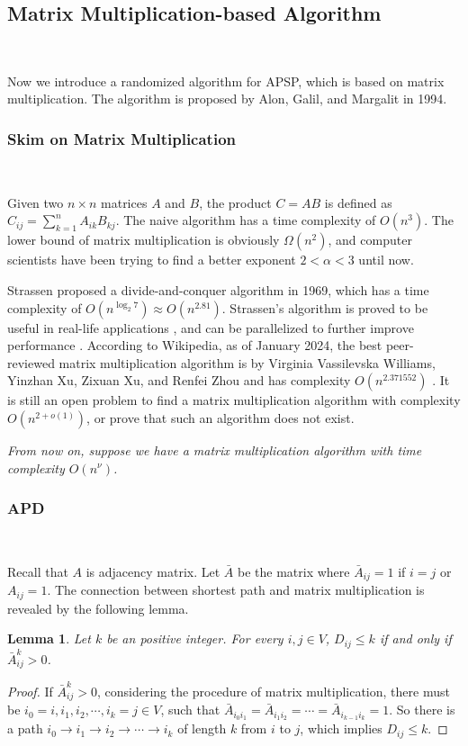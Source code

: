 \documentclass[11pt]{article}
\theoremstyle{plain}
\newtheorem{lemma}{Lemma}[section]
\begin{document}
\subsection{Matrix Multiplication-based Algorithm}\

Now we introduce a randomized algorithm for APSP, which is based on matrix multiplication. The algorithm is proposed by Alon, Galil, and Margalit in 1994.

\subsubsection{Skim on Matrix Multiplication}\

Given two $n\times n$ matrices $A$ and $B$, the product $C=AB$ is defined as $C_{ij}=\sum_{k=1}^n A_{ik}B_{kj}$. The naive algorithm has a time complexity of $O(n^3)$. The lower bound of matrix multiplication is obviously $\Omega(n^2)$, and computer scientists have been trying to find a better exponent $2<\alpha<3$ until now.

Strassen proposed a divide-and-conquer algorithm in 1969, which has a time complexity of $O(n^{\log_2 7})\approx O(n^{2.81})$. Strassen's algorithm is proved to be useful in real-life applications \cite{cite-key}, and can be parallelized to further improve performance \cite{CHOU199549}. According to Wikipedia, as of January 2024, the best peer-reviewed matrix multiplication algorithm is by Virginia Vassilevska Williams, Yinzhan Xu, Zixuan Xu, and Renfei Zhou and has complexity $O(n^{2.371552})$ \cite{williams2023newboundsmatrixmultiplication}. It is still an open problem to find a matrix multiplication algorithm with complexity $O(n^{2+o(1)})$, or prove that such an algorithm does not exist.

\emph{From now on, suppose we have a matrix multiplication algorithm with time complexity $O(n^\nu)$.}

\subsubsection{APD}\

Recall that $A$ is adjacency matrix. Let $\bar{A}$ be the matrix where $\bar{A}_{ij}=1$ if $i=j$ or $A_{ij}=1$. The connection between shortest path and matrix multiplication is revealed by the following lemma.
\begin{lemma}
    \label{lemma:shortest_path_matrix_multiplication}
    Let $k$ be an positive integer. For every $i,j\in V$, $D_{ij}\le k$ if and only if $\bar{A}^k_{ij}>0$.
\end{lemma}
\begin{proof}
If $\bar{A}^k_{ij}>0$, considering the procedure of matrix multiplication, there must be $i_0=i,i_1,i_2,\cdots,i_k=j\in V$, such that $\bar A_{i_0i_1}=\bar A_{i_1i_2}=\cdots=\bar A_{i_{k-1}i_k}=1$. So there is a path $i_0\to i_1\to i_2\to\cdots\to i_k$ of length $k$ from $i$ to $j$, which implies $D_{ij}\le k$.
\end{proof}
\end{document}
